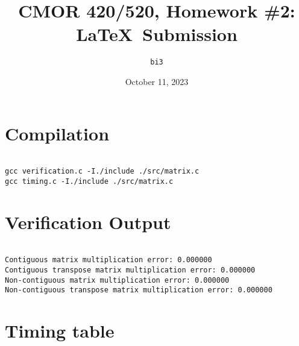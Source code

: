 \documentclass{article}
\begin{document}
\title{CMOR 420\slash520, Homework \#2: \LaTeX\ Submission}
\author{\texttt{bi3}}
\date{October 11, 2023}
\maketitle

\section{Compilation}

\begin{verbatim}

gcc verification.c -I./include ./src/matrix.c
gcc timing.c -I./include ./src/matrix.c

\end{verbatim}

\section{Verification Output}

\begin{verbatim}

Contiguous matrix multiplication error: 0.000000
Contiguous transpose matrix multiplication error: 0.000000
Non-contiguous matrix multiplication error: 0.000000
Non-contiguous transpose matrix multiplication error: 0.000000

\end{verbatim}

\section{Timing table}
\end{document}

